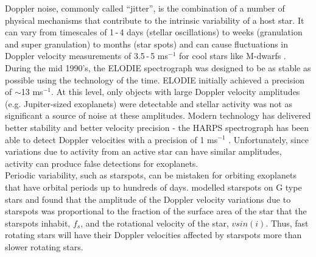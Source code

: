 Doppler noise, commonly called ``jitter'', is the combination of a number of physical mechanisms that contribute to the intrinsic variability of a host star. It can vary from timescales of 1\,-\,4 days (stellar oscillations) to weeks (granulation and super granulation) to months (star spots) and can cause fluctuations in Doppler velocity measurements of 3.5\,-\,5 ms$^{-1}$ for cool stars like M-dwarfs \citep{2005Wright}.\\

During the mid 1990's, the ELODIE spectrograph \citep{1996Baranne} was designed to be as stable as possible using the technology of the time. ELODIE initially achieved a precision of $\sim$13 ms$^{-1}$. At this level, only objects with large Doppler velocity amplitudes (e.g. Jupiter-sized exoplanets) were detectable and stellar activity was not as significant a source of noise at these amplitudes. Modern technology has delivered better stability and better velocity precision - the HARPS spectrograph \citep{2010Wright} has been able to detect Doppler velocities with a precision of 1 ms$^{-1}$ \citep{2011Dumusque}. Unfortunately, since variations due to activity from an active star can have similar amplitudes, activity can produce false detections for exoplanets.\\

Periodic variability, such as starspots, can be mistaken for orbiting exoplanets that have orbital periods up to hundreds of days. \citet{1997Saar} modelled starspots on G type stars and found that the amplitude of the Doppler velocity variations due to starspots was proportional to the fraction of the surface area of the star that the starspots inhabit, $f_s$, and the rotational velocity of the star, $v sin(i)$. Thus, fast rotating stars will have their Doppler velocities affected by starspots more than slower rotating stars.\\

